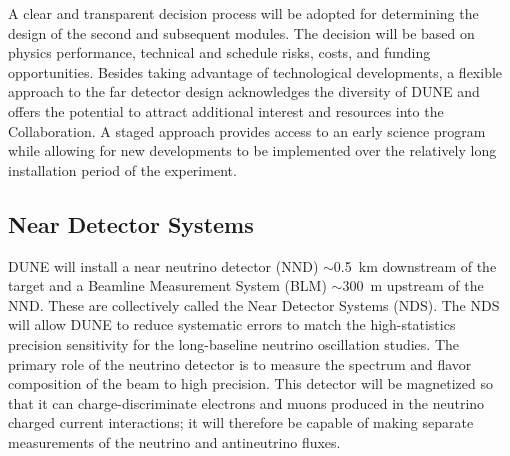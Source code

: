 
A clear and transparent decision process will be adopted for
determining the design of the second and subsequent modules.  The
decision will be based on physics performance, technical and schedule
risks, costs, and funding opportunities.  Besides taking advantage of
technological developments, a flexible approach to the far detector
design acknowledges the diversity of DUNE and offers the potential to
attract additional interest and resources into the Collaboration. A
staged approach provides access to an early science program while
allowing for new developments to be implemented over the relatively
long installation period of the experiment.

\subsection{Near Detector Systems}
\label{sec:intro-dune-near-det}

DUNE will install a near neutrino detector (NND) $\sim$0.5~km
downstream of the target and a Beamline Measurement System (BLM)
$\sim$300~m upstream of the NND. These are collectively called the
Near Detector Systems (NDS).  The NDS will allow DUNE to reduce
systematic errors to match the high-statistics precision sensitivity
for the long-baseline neutrino oscillation studies.  The primary role
of the neutrino detector is to measure the spectrum and flavor
composition of the beam to high precision. This detector will be
magnetized so that it can charge-discriminate electrons and muons
produced in the neutrino charged current interactions; it will
therefore be capable of making separate measurements of the neutrino
and antineutrino fluxes.
%


